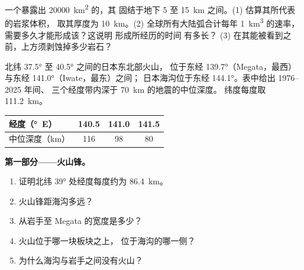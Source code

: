 \begin{exercise}[$\star\star\star$]\label{exo:g12:subduction-magmatism:15}
一个暴露出 \qty{20000}{km^2} 的，其
固结于地下 5 至 \qty{15}{km} 之间。(1) 估算其所代表的岩浆体积，
取其厚度为 \qty{10}{km}。(2) 全球所有大陆弧合计每年 \qty{1}{km^3} 的速率，
需要多久才能形成该？这说明
形成所经历的时间
有多长？
(3) 在其能被看到之前，上方须剥蚀掉多少岩石？
\end{exercise}

\begin{problem}
\label{pb:g12:subduction-magmatism:1}
北纬 \ang{37.5} 至 \ang{40.5} 之间的日本东北部火山，
位于东经 \ang{139.7}（Megata，最西）与东经 \ang{141.0}（Iwate，最东）之间；
日本海沟位于东经 \ang{144.1}。表中给出 1976--2025 年间、
三个经度带内深于 \qty{70}{km} 的地震的中位深度。
纬度每度取 \qty{111.2}{km}。

\begin{center}
\small
\begin{tabular}{|l|c|c|c|}
\hline
经度（\unit{\degree}~E） & 140.5 & 141.0 & 141.5 \\ \hline
中位深度（\unit{km}） & 116 & 98 & 80 \\ \hline
\end{tabular}
\end{center}

\medskip
\noindent\textbf{第一部分——火山锋。}
\begin{enumerate}
  \item 证明北纬 \ang{39} 处经度每度约为
        \qty{86.4}{km}。
  \item 火山锋距海沟多远？
  \item {}从岩手至 Megata 的宽度是多少？
  \item 火山位于哪一块板块之上，
        位于海沟的哪一侧？
  \item 为什么海沟与岩手之间没有火山？
\end{enumerate}


\end{problem}
